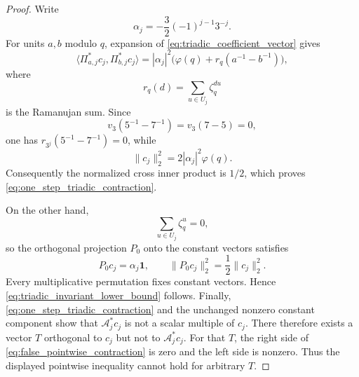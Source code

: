 \documentclass[11pt]{amsart}
\numberwithin{equation}{section}
\theoremstyle{plain}
\theoremstyle{definition}
\theoremstyle{remark}
\begin{document}
\begin{proof}
Write
\begin{equation}
\alpha_j=-\frac32(-1)^{j-1}3^{-j}.
\label{eq:triadic_alpha}
\end{equation}
For units $a,b$ modulo $q$, expansion of \eqref{eq:triadic_coefficient_vector} gives
\begin{equation}
\langle \Pi_{a,j}^*c_j,\Pi_{b,j}^*c_j\rangle
=
|\alpha_j|^2\bigl(\varphi(q)+r_q(a^{-1}-b^{-1})\bigr),
\label{eq:triadic_ramanujan_inner_product}
\end{equation}
where
\begin{equation}
r_q(d)=\sum_{u\in U_j}\zeta_q^{du}
\label{eq:ramanujan_sum_definition}
\end{equation}
is the Ramanujan sum.  Since
\begin{equation}
v_3(5^{-1}-7^{-1})=v_3(7-5)=0,
\label{eq:inverse_difference_valuation}
\end{equation}
one has $r_{3^j}(5^{-1}-7^{-1})=0$, while
\begin{equation}
\|c_j\|_2^2=2|\alpha_j|^2\varphi(q).
\label{eq:triadic_coefficient_norm}
\end{equation}
Consequently the normalized cross inner product is $1/2$, which proves \eqref{eq:one_step_triadic_contraction}.

On the other hand,
\begin{equation}
\sum_{u\in U_j}\zeta_q^u=0,
\label{eq:primitive_root_sum_zero}
\end{equation}
so the orthogonal projection $P_0$ onto the constant vectors satisfies
\begin{equation}
P_0c_j=\alpha_j\mathbf 1,
\qquad
\|P_0c_j\|_2^2=\frac12\|c_j\|_2^2.
\label{eq:triadic_invariant_projection}
\end{equation}
Every multiplicative permutation fixes constant vectors.  Hence \eqref{eq:triadic_invariant_lower_bound} follows.  Finally, \eqref{eq:one_step_triadic_contraction} and the unchanged nonzero constant component show that $\mathcal A_j^*c_j$ is not a scalar multiple of $c_j$.  There therefore exists a vector $T$ orthogonal to $c_j$ but not to $\mathcal A_j^*c_j$.  For that $T$, the right side of \eqref{eq:false_pointwise_contraction} is zero and the left side is nonzero.  Thus the displayed pointwise inequality cannot hold for arbitrary $T$.
\end{proof}
\end{document}
